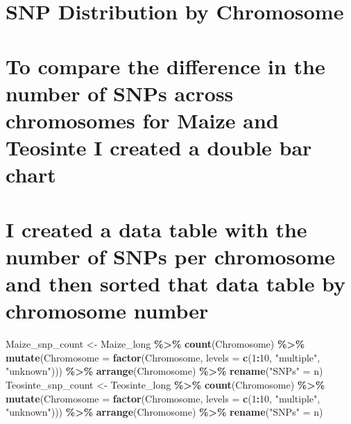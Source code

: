 \documentclass[
]{article}
\newenvironment{Shaded}{\begin{snugshade}}{\end{snugshade}}
\newcommand{\AttributeTok}[1]{\textcolor[rgb]{0.13,0.29,0.53}{#1}}
\newcommand{\DecValTok}[1]{\textcolor[rgb]{0.00,0.00,0.81}{#1}}
\newcommand{\FunctionTok}[1]{\textcolor[rgb]{0.13,0.29,0.53}{\textbf{#1}}}
\newcommand{\NormalTok}[1]{#1}
\newcommand{\OtherTok}[1]{\textcolor[rgb]{0.56,0.35,0.01}{#1}}
\newcommand{\SpecialCharTok}[1]{\textcolor[rgb]{0.81,0.36,0.00}{\textbf{#1}}}
\newcommand{\StringTok}[1]{\textcolor[rgb]{0.31,0.60,0.02}{#1}}
\begin{document}
\section{SNP Distribution by
Chromosome}\label{snp-distribution-by-chromosome}

\section{To compare the difference in the number of SNPs across
chromosomes for Maize and Teosinte I created a double bar
chart}\label{to-compare-the-difference-in-the-number-of-snps-across-chromosomes-for-maize-and-teosinte-i-created-a-double-bar-chart}

\section{I created a data table with the number of SNPs per chromosome
and then sorted that data table by chromosome
number}\label{i-created-a-data-table-with-the-number-of-snps-per-chromosome-and-then-sorted-that-data-table-by-chromosome-number}

\begin{Shaded}
\begin{Highlighting}[]
\NormalTok{Maize\_snp\_count }\OtherTok{\textless{}{-}}\NormalTok{ Maize\_long }\SpecialCharTok{\%\textgreater{}\%} \FunctionTok{count}\NormalTok{(Chromosome) }\SpecialCharTok{\%\textgreater{}\%} 
  \FunctionTok{mutate}\NormalTok{(}\AttributeTok{Chromosome =} \FunctionTok{factor}\NormalTok{(Chromosome, }\AttributeTok{levels =} \FunctionTok{c}\NormalTok{(}\DecValTok{1}\SpecialCharTok{:}\DecValTok{10}\NormalTok{, }\StringTok{"multiple"}\NormalTok{, }\StringTok{"unknown"}\NormalTok{))) }\SpecialCharTok{\%\textgreater{}\%} 
  \FunctionTok{arrange}\NormalTok{(Chromosome) }\SpecialCharTok{\%\textgreater{}\%} \FunctionTok{rename}\NormalTok{(}\StringTok{"SNPs"} \OtherTok{=}\NormalTok{ n)}
\NormalTok{Teosinte\_snp\_count }\OtherTok{\textless{}{-}}\NormalTok{ Teosinte\_long }\SpecialCharTok{\%\textgreater{}\%} \FunctionTok{count}\NormalTok{(Chromosome) }\SpecialCharTok{\%\textgreater{}\%} 
  \FunctionTok{mutate}\NormalTok{(}\AttributeTok{Chromosome =} \FunctionTok{factor}\NormalTok{(Chromosome, }\AttributeTok{levels =} \FunctionTok{c}\NormalTok{(}\DecValTok{1}\SpecialCharTok{:}\DecValTok{10}\NormalTok{, }\StringTok{"multiple"}\NormalTok{, }\StringTok{"unknown"}\NormalTok{))) }\SpecialCharTok{\%\textgreater{}\%} 
  \FunctionTok{arrange}\NormalTok{(Chromosome) }\SpecialCharTok{\%\textgreater{}\%} \FunctionTok{rename}\NormalTok{(}\StringTok{"SNPs"} \OtherTok{=}\NormalTok{ n)}
\end{Highlighting}
\end{Shaded}
\end{document}
